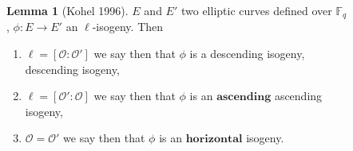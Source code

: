 \documentclass[10pt,a4paper]{beamer}
\theoremstyle{plain}
\theoremstyle{definition}
\newtheorem{lem}[thm]{Lemma}
\theoremstyle{definition}
\theoremstyle{definition}
\theoremstyle{definition}
\newtheorem{defi}[thm]{Definition}
\theoremstyle{remark}
\theoremstyle{remark}
\begin{document}
\begin{frame}
\begin{columns}
\begin{column}[r]{6cm}
{\begin{figure}
\begin{center}
\begin{tikzpicture}[scale=0.60]


\end{tikzpicture}
\end{center}		
\end{figure}}


\end{column}
\begin{column}[left]{4cm}
\begin{lem}[Kohel 1996]
$E$ and $E'$ two elliptic curves defined over $\mathbb{F}_q$, $\phi :E \rightarrow E'$ an $\ell$-isogeny. Then
\begin{enumerate}
\item  $\ell=[\mathcal{O} : \mathcal{O}']$ we say then that $\phi$ is a 
 {descending isogeny,}
 {descending isogeny,}

\pause
\item $\ell=[\mathcal{O}':\mathcal{O}]$ we say then that $\phi$ is an  {$\textbf{ascending}$}
 {ascending} isogeny,
\pause 
\item $\mathcal{O}=\mathcal{O}'$ we say then that $\phi$ is an $\textbf{horizontal}$ isogeny.
\end{enumerate}
\end{lem}
\end{column}

\end{columns}
\end{frame}
\end{document}
